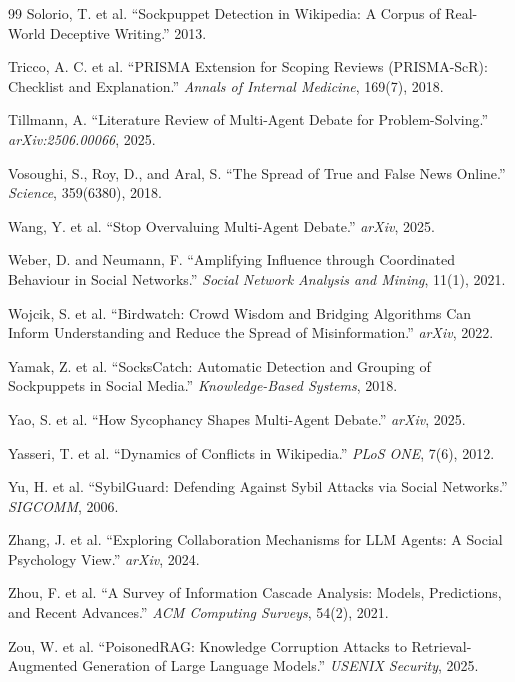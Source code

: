 \documentclass[11pt]{article}
\begin{document}
\begin{thebibliography}{99}
 Solorio, T. et al. ``Sockpuppet Detection in Wikipedia: A Corpus of Real-World Deceptive Writing.'' 2013.

 Tricco, A. C. et al. ``PRISMA Extension for Scoping Reviews (PRISMA-ScR): Checklist and Explanation.'' \textit{Annals of Internal Medicine}, 169(7), 2018.

 Tillmann, A. ``Literature Review of Multi-Agent Debate for Problem-Solving.'' \textit{arXiv:2506.00066}, 2025.

 Vosoughi, S., Roy, D., and Aral, S. ``The Spread of True and False News Online.'' \textit{Science}, 359(6380), 2018.

 Wang, Y. et al. ``Stop Overvaluing Multi-Agent Debate.'' \textit{arXiv}, 2025.

 Weber, D. and Neumann, F. ``Amplifying Influence through Coordinated Behaviour in Social Networks.'' \textit{Social Network Analysis and Mining}, 11(1), 2021.

 Wojcik, S. et al. ``Birdwatch: Crowd Wisdom and Bridging Algorithms Can Inform Understanding and Reduce the Spread of Misinformation.'' \textit{arXiv}, 2022.

 Yamak, Z. et al. ``SocksCatch: Automatic Detection and Grouping of Sockpuppets in Social Media.'' \textit{Knowledge-Based Systems}, 2018.

 Yao, S. et al. ``How Sycophancy Shapes Multi-Agent Debate.'' \textit{arXiv}, 2025.

 Yasseri, T. et al. ``Dynamics of Conflicts in Wikipedia.'' \textit{PLoS ONE}, 7(6), 2012.

 Yu, H. et al. ``SybilGuard: Defending Against Sybil Attacks via Social Networks.'' \textit{SIGCOMM}, 2006.

 Zhang, J. et al. ``Exploring Collaboration Mechanisms for LLM Agents: A Social Psychology View.'' \textit{arXiv}, 2024.

 Zhou, F. et al. ``A Survey of Information Cascade Analysis: Models, Predictions, and Recent Advances.'' \textit{ACM Computing Surveys}, 54(2), 2021.

 Zou, W. et al. ``PoisonedRAG: Knowledge Corruption Attacks to Retrieval-Augmented Generation of Large Language Models.'' \textit{USENIX Security}, 2025.

\end{thebibliography}
\end{document}
